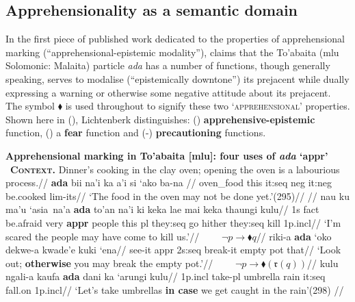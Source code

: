 \subsection{Apprehensionality as a semantic domain}\label{typ.appr}

In the first piece of published work dedicated to the properties of apprehensional marking (``apprehensional-epistemic modality''), \citet{Lichtenberk1995} claims that the To'abaita (\gls{mlu} Solomonic: Malaita) particle \textit{ada} has a number of functions, though generally speaking, serves to modalise (``epistemically downtone'') its prejacent while dually expressing a warning or otherwise some negative attitude about its prejacent. The symbol $ \blacklozenge $ is used throughout to signify these two `\textsc{apprehensional}' properties. Shown here in (), Lichtenberk distinguishes: () \textbf{apprehensive-epistemic} function, () a \textbf{fear} function and (-) \textbf{precautioning} functions.

	\pex \textbf{Apprehensional marking in To'abaita [\gls{mlu}]: four uses of \textit{ada} `\gls{appr}'}
	\a{}%
	\begingl %
	\glpreamble {}\\\ \textbf{\textsc{Context}.} Dinner's cooking in the clay oven; opening the oven is a labourious process.//
	\gla \textbf{ada} bii na'i ka a'i si `ako ba-na // 
	\glb {} oven\_food this it:{\sc seq} {\sc neg} it{\sc:neg} be.cooked {\sc lim-}its//
	\glft `The food in the oven may not be done yet.'\hfill(295)//%
	\endgl %
	\a{}\begingl
	\glpreamble {}//
	\gla nau ku ma'u `asia~na'a \textbf{ada} to'an na'i ki keka lae mai keka thaungi kulu//
	\glb 1s \gls{fact} be.afraid very \textbf{\gls{appr}} people this \gls{pl} they:\gls{seq} go hither they:\gls{seq} kill 1p.\gls{incl}//
	\glft`I'm scared the people may have come to kill us.'//
	\endgl
	\a{}\begingl\glpreamble{}$ \qquad \neg p\to\blacklozenge q $//
	\gla riki-a \textbf{ada} `oko dekwe-a kwade'e kuki `ena//
	\glb see-it \gls{appr} 2s:\gls{seq} break-it empty pot that//
	\glft`Look out; \textbf{otherwise} you may break the empty pot.'//\endgl
	\a{}\begingl\glpreamble {}$ \qquad \neg p\to\blacklozenge(\mathfrak{r}(q)) $//
	\gla kulu ngali-a kaufa \textbf{ada} dani ka `arungi kulu//
	\glb 1p{\sc.incl} take{\sc-pl} umbrella  rain it:{\sc seq} fall.on 1p{\sc.incl}//
	\glft `Let's take umbrellas \textbf{in case} we get caught in the rain'\hfill(298) //\endgl
	\xe


